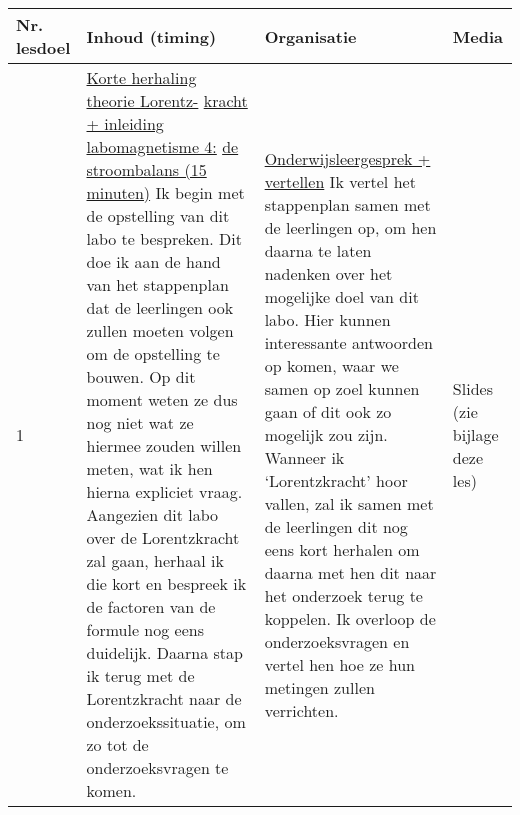 \begin{landscape}
\begin{tabularx}{1.56\textwidth}{|p{1.5cm}|p{7cm}|X|p{4cm}|}
	\hline
	\textbf{Nr. lesdoel } & \textbf{Inhoud (timing)}  & \textbf{Organisatie } & \textbf{Media } \\ \hline
	1&\underline{Korte herhaling theorie Lorentz-} \underline{kracht + inleiding labomagnetisme 4:} \underline{de stroombalans (15 minuten)}\newline
	Ik begin met de opstelling van dit labo te bespreken. Dit doe ik aan de hand van het stappenplan dat de leerlingen ook zullen moeten volgen om de opstelling te bouwen. Op dit moment weten ze dus nog niet wat ze hiermee zouden willen meten, wat ik hen hierna expliciet vraag. \newline
	Aangezien dit labo over de Lorentzkracht zal gaan, herhaal ik die kort en bespreek ik de factoren van de formule nog eens duidelijk. Daarna stap ik terug met de Lorentzkracht naar de onderzoekssituatie, om zo tot de onderzoeksvragen te komen. 
	&  \underline{Onderwijsleergesprek + vertellen}\newline 
	Ik vertel het stappenplan samen met de leerlingen op, om hen daarna te laten nadenken over het mogelijke doel van dit labo. Hier kunnen interessante antwoorden op komen, waar we samen op zoel kunnen gaan of dit ook zo mogelijk zou zijn. Wanneer ik `Lorentzkracht' hoor vallen, zal ik samen met de leerlingen dit nog eens kort herhalen om daarna met hen dit naar het onderzoek terug te koppelen. 
	Ik overloop de onderzoeksvragen en vertel hen hoe ze hun metingen zullen verrichten.
	
	
	& Slides (zie bijlage deze les) 
	\\ \hline
\end{tabularx}




\end{landscape}
